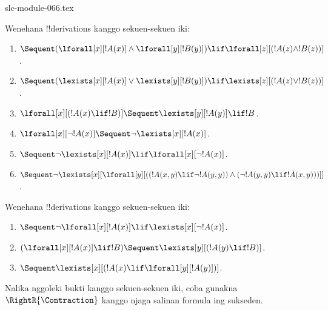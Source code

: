 \begin{filecontents*}[overwrite]{slc-module-066.tex}
\begin{prob}
Wenehana !!{derivation}s kanggo sekuen-sekuen iki:
\begin{enumerate}
\item $\Sequent (\lforall[x][!A(x)] \land \lforall[y][!B(y)]) \lif
\lforall[z][(!A(z) \land !B(z))]$.
\item $\Sequent (\lexists[x][!A(x)] \lor \lexists[y][!B(y)]) \lif
\lexists[z][(!A(z) \lor !B(z))]$.
\item $\lforall[x][(!A(x) \lif !B)] \Sequent \lexists[y][!A(y)] \lif !B$.
\item $\lforall[x][\lnot !A(x)] \Sequent \lnot\lexists[x][!A(x)]$.
\item $\Sequent \lnot\lexists[x][!A(x)] \lif \lforall[x][\lnot !A(x)]$.
\item $\Sequent \lnot\lexists[x][\lforall[y][((!A(x,y) \lif \lnot
!A(y,y)) \land (\lnot !A(y,y) \lif !A(x,y)))]]$.
\end{enumerate}
\end{prob}

\begin{prob}
Wenehana !!{derivation}s kanggo sekuen-sekuen iki:
\begin{enumerate}
\item $\Sequent \lnot\lforall[x][!A(x)] \lif \lexists[x][\lnot!A(x)]$.
\item $(\lforall[x][!A(x)] \lif !B) \Sequent \lexists[y][(!A(y) \lif !B)]$.
\item $\Sequent \lexists[x][(!A(x) \lif \lforall[y][!A(y)])]$.
\end{enumerate}
Nalika nggoleki bukti kanggo sekuen-sekuen iki, coba gunakna
$\RightR{\Contraction}$ kanggo njaga salinan formula ing sukseden.
\end{prob}


\end{filecontents*}

